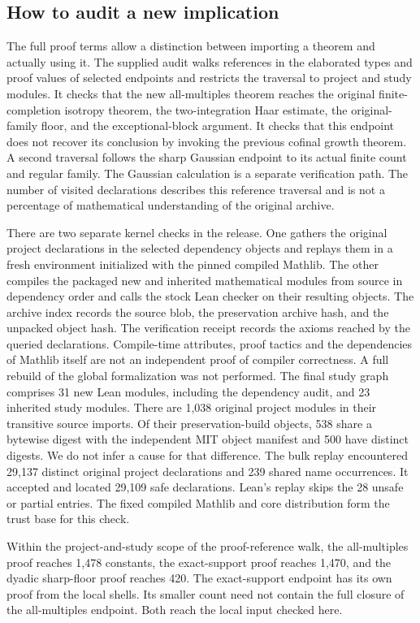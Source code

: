 \documentclass[12pt,letterpaper]{article}
\begin{document}
\subsection{How to audit a new implication}
The full proof terms allow a distinction between importing a theorem and actually using it. The supplied audit walks references in the elaborated types and proof values of selected endpoints and restricts the traversal to project and study modules. It checks that the new all-multiples theorem reaches the original finite-completion isotropy theorem, the two-integration Haar estimate, the original-family floor, and the exceptional-block argument. It checks that this endpoint does not recover its conclusion by invoking the previous cofinal growth theorem. A second traversal follows the sharp Gaussian endpoint to its actual finite count and regular family. The Gaussian calculation is a separate verification path. The number of visited declarations describes this reference traversal and is not a percentage of mathematical understanding of the original archive.
\par
There are two separate kernel checks in the release. One gathers the original project declarations in the selected dependency objects and replays them in a fresh environment initialized with the pinned compiled Mathlib. The other compiles the packaged new and inherited mathematical modules from source in dependency order and calls the stock Lean checker on their resulting objects. The archive index records the source blob, the preservation archive hash, and the unpacked object hash. The verification receipt records the axioms reached by the queried declarations. Compile-time attributes, proof tactics and the dependencies of Mathlib itself are not an independent proof of compiler correctness. A full rebuild of the global formalization was not performed.
The final study graph comprises 31 new Lean modules, including the dependency audit, and 23 inherited study modules. There are 1,038 original project modules in their transitive source imports. Of their preservation-build objects, 538 share a bytewise digest with the independent MIT object manifest and 500 have distinct digests. We do not infer a cause for that difference. The bulk replay encountered 29,137 distinct original project declarations and 239 shared name occurrences. It accepted and located 29,109 safe declarations. Lean's replay skips the 28 unsafe or partial entries. The fixed compiled Mathlib and core distribution form the trust base for this check.
\par
Within the project-and-study scope of the proof-reference walk, the all-multiples proof reaches 1,478 constants, the exact-support proof reaches 1,470, and the dyadic sharp-floor proof reaches 420. The exact-support endpoint has its own proof from the local shells. Its smaller count need not contain the full closure of the all-multiples endpoint. Both reach the local input checked here.
\end{document}
